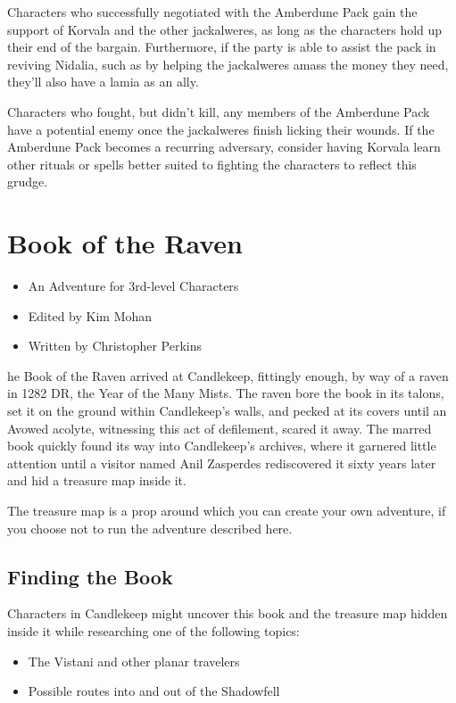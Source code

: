 \documentclass[10pt,a4paper,twoside,bg=print,twocolumn,openany,nodeprecatedcode]{dndbook}
\begin{document}
Characters who successfully negotiated with the Amberdune Pack gain the support of Korvala and the other jackalweres, as long as the characters hold up their end of the bargain. Furthermore, if the party is able to assist the pack in reviving Nidalia, such as by helping the jackalweres amass the money they need, they'll also have a lamia as an ally.

Characters who fought, but didn't kill, any members of the Amberdune Pack have a potential enemy once the jackalweres finish licking their wounds. If the Amberdune Pack becomes a recurring adversary, consider having Korvala learn other rituals or spells better suited to fighting the characters to reflect this grudge.

\chapter{Book of the Raven}

\begin{itemize}
\item An Adventure for 3rd-level Characters
\item Edited by Kim Mohan
\item Written by Christopher Perkins
\end{itemize}

he Book of the Raven arrived at Candlekeep, fittingly enough, by way of a raven in 1282 DR, the Year of the Many Mists. The raven bore the book in its talons, set it on the ground within Candlekeep's walls, and pecked at its covers until an Avowed acolyte, witnessing this act of defilement, scared it away. The marred book quickly found its way into Candlekeep's archives, where it garnered little attention until a visitor named Anil Zasperdes rediscovered it sixty years later and hid a treasure map inside it.


The treasure map is a prop around which you can create your own adventure, if you choose not to run the adventure described here.

\section{Finding the Book}
Characters in Candlekeep might uncover this book and the treasure map hidden inside it while researching one of the following topics:


\begin{itemize}
\item The Vistani and other planar travelers
\item Possible routes into and out of the Shadowfell
\end{itemize}
\end{document}
